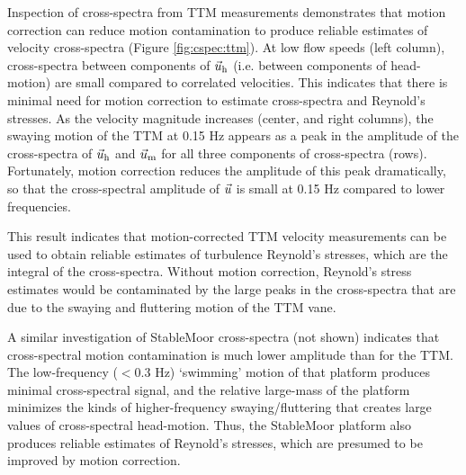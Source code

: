 Inspection of cross-spectra from TTM measurements demonstrates that motion correction can reduce motion contamination to produce reliable estimates of velocity cross-spectra (Figure \ref{fig:cspec:ttm}). At low flow speeds (left column), cross-spectra between components of $\vec{u}_\mathrm{h}$ (i.e. between components of head-motion) are small compared to correlated velocities. This indicates that there is minimal need for motion correction to estimate cross-spectra and Reynold's stresses. As the velocity magnitude increases (center, and right columns), the swaying motion of the TTM at 0.15 Hz appears as a peak in the amplitude of the cross-spectra of $\vec{u}_\mathrm{h}$ and $\vec{u}_\mathrm{m}$ for all three components of cross-spectra (rows). Fortunately, motion correction reduces the amplitude of this peak dramatically, so that the cross-spectral amplitude of $\vec{u}$ is small at 0.15 Hz compared to lower frequencies.

This result indicates that motion-corrected TTM velocity measurements can be used to obtain reliable estimates of turbulence Reynold's stresses, which are the integral of the cross-spectra. Without motion correction, Reynold's stress estimates would be contaminated by the large peaks in the cross-spectra that are due to the swaying and fluttering motion of the TTM vane.

A similar investigation of StableMoor cross-spectra (not shown) indicates that cross-spectral motion contamination is much lower amplitude than for the TTM. The low-frequency ($<0.3$ Hz) `swimming' motion of that platform produces minimal cross-spectral signal, and the relative large-mass of the platform minimizes the kinds of higher-frequency swaying/fluttering that creates large values of cross-spectral head-motion. Thus, the StableMoor platform also produces reliable estimates of Reynold's stresses, which are presumed to be improved by motion correction.  





